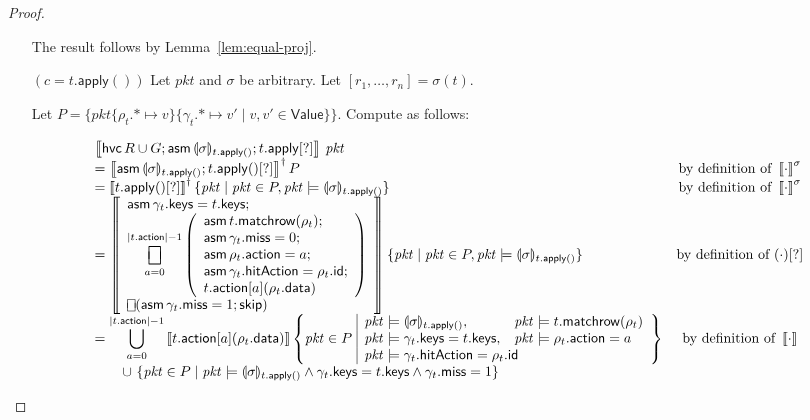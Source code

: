 \documentclass{article}
\newcommand{\pkt}{\mathit{pkt}}
\newcommand{\denote}[1]{\left\llbracket#1\right\rrbracket}
\newcommand{\Value}{\mathsf{Value}}
\newcommand{\action}{\mathsf{action}}
\newcommand{\keys}{\mathsf{keys}}
\newcommand{\data}{\mathsf{data}}
\newcommand{\id}{\mathsf{id}}
\newcommand{\hitAction}{\mathsf{hitAction}}
\newcommand{\miss}{\mathsf{miss}}
\newcommand{\assume}{\mathop{\mathsf{asm}}}
\newcommand{\apply}{\mathsf{apply}}
\newcommand{\choiceop}{\rotatebox[origin=c]{90}{$\sqsubset\!\!\!\sqsupset$}}
\newcommand{\choice}{\mathbin{\choiceop}}
\DeclareMathOperator*{\bigchoice}{\scalerel*{\choiceop}{\sum}}
\newcommand{\havoc}[1]{\mathop{\mathsf{hvc}}#1}
\newcommand{\SKIP}{\mathsf{skip}}
\newcommand{\state}[1]{\llparenthesis#1\rrparenthesis}
\newcommand{\instr}{[?]}
\newcommand{\matchrow}{\mathsf{matchrow}}
\theoremstyle{plain}
\theoremstyle{definition}
\theoremstyle{remark}
\begin{document}
\begin{proof}
\begin{enumerate}[align=left]
    The result follows by Lemma~\ref{lem:equal-proj}.

  \item[$(c = t.\apply())$] Let $\pkt$ and $\sigma$ be arbitrary. Let
    $[r_1,\ldots, r_n] = \sigma(t)$.

    Let $P = \{\pkt\{\rho_t.* \mapsto
      v\}\{\gamma_t.* \mapsto v' \mid v,v' \in \Value\} \}$.
      Compute as follows:

      \[\begin{array}{lcl}
      \denote{\havoc R \cup G; \assume {\state\sigma_{t.\apply()}}; t.\apply\instr}\,\pkt
      & \\
      = \denote{\assume {\state\sigma_{t.\apply()}}; t.\apply()\instr}^\dagger P
      & \text{by definition of }\denote{\cdot}^\sigma \\
      = \denote{t.\apply()\instr}^\dagger \{\pkt \mid \pkt \in P, \pkt \models \state\sigma_{t.\apply()} \}
      & \text{by definition of }\denote{\cdot}^\sigma \\
      = \denote{  \begin{array}{l} \displaystyle
          \assume \gamma_t.\keys = t.\keys; \\
          \displaystyle \bigchoice_{a=0}^{|t.\action| -1}
          \left(\begin{array}{l}
            \assume t.\matchrow(\rho_t); \\
            \assume \gamma_t.\miss = 0;\\
            \assume \rho_t.\action = a;\\
            \assume \gamma_t.\hitAction = \rho_t.\id;\\
            t.\action[a](\rho_t.\data)
          \end{array}\right) \\
          \choice (\assume \gamma_t.\miss = 1;\SKIP) \\
      \end{array}}
      \{\pkt \mid \pkt \in P, \pkt \models \state\sigma_{t.\apply()} \}
      & \text{by definition of }(\cdot)\instr \\
      = \displaystyle\bigcup_{a=0}^{|t.\action| - 1}
      \denote{t.\action[a](\rho_t.\data)}
      \left\{\pkt \in P\,\, \begin{array}{|ll}
        \pkt \models \state\sigma_{t.\apply()}, & \pkt \models t.\matchrow(\rho_t)\\
        \pkt \models \gamma_t.\keys = t.\keys, & \pkt \models \rho_t.\action = a \\
        \multicolumn{2}{|l}{\pkt \models \gamma_t.\hitAction = \rho_t.\id}
      \end{array}\right\}
      & \text{by definition of }\denote{\cdot}\\
      \qquad \cup\,\,\{\pkt \in P \mid \pkt \models \state\sigma_{t.\apply()} \wedge \gamma_t.\keys = t.\keys \wedge \gamma_t.\miss = 1 \}
      \end{array}\]


\end{enumerate}
\end{proof}
\end{document}
